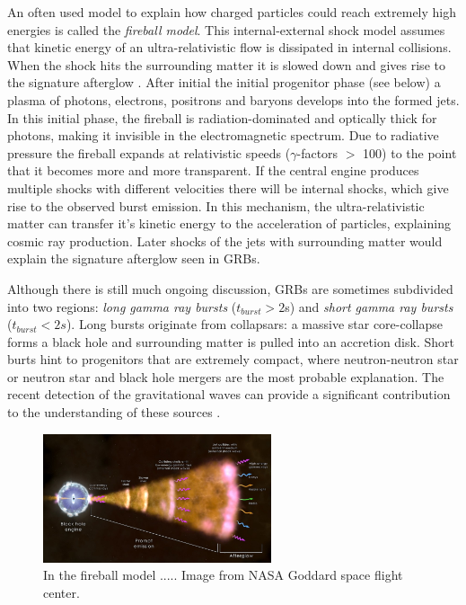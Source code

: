 An often used model to explain how charged particles could reach extremely high energies is called the \textit{fireball model}. This internal-external shock model assumes that kinetic energy of an ultra-relativistic flow is dissipated in internal collisions. When the shock hits the surrounding matter it is slowed down and gives rise to the signature afterglow \cite{Piran:2004ba}. After initial the initial progenitor phase (see below) a plasma of photons, electrons, positrons and baryons develops into the formed jets. In this initial phase, the fireball is radiation-dominated and optically thick for photons, making it invisible in the electromagnetic spectrum. Due to radiative pressure the fireball expands at relativistic speeds ($\gamma$-factors $>$ 100) to the point that it becomes more and more transparent. If the central engine produces multiple shocks with different velocities there will be internal shocks, which give rise to the observed burst emission. In this mechanism, the ultra-relativistic matter can transfer it's kinetic energy to the acceleration of particles, explaining cosmic ray production. Later shocks of the jets with surrounding matter would explain the signature afterglow seen in GRBs.

Although there is still much ongoing discussion, GRBs are sometimes subdivided into two regions: \textit{long gamma ray bursts} ($t_{burst} > 2$s) and \textit{short gamma ray bursts} ($t_{burst} < 2s$). Long bursts originate from collapsars: a massive star core-collapse forms a black hole and surrounding matter is pulled into an accretion disk. Short burts hint to progenitors that are extremely compact, where neutron-neutron star or neutron star and black hole mergers are the most probable explanation. The recent detection of the gravitational waves can provide a significant contribution to the understanding of these sources \cite{TheLIGOScientific:2017qsa,Abbott:2017oio,Abbott:2017gyy,Abbott:2017vtc,Abbott:2016nmj}.

\begin{figure}
\centering
\includegraphics[width=0.6\textwidth]{chapter3/img/fireball.jpg}
\caption{In the fireball model ..... Image from NASA Goddard space flight center.}
\end{figure}

